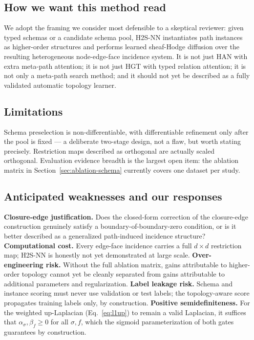 \documentclass{article}
\begin{document}
\subsection{How we want this method read}

We adopt the framing we consider most defensible to a skeptical reviewer: given typed schemas or a
candidate schema pool, H2S-NN instantiates path instances as higher-order structures and performs
learned sheaf-Hodge diffusion over the resulting heterogeneous node-edge-face incidence system. It
is not just HAN with extra meta-path attention; it is not just HGT with typed relation attention;
it is not only a meta-path search method; and it should not yet be described as a fully validated
automatic topology learner.

\subsection{Limitations}

Schema preselection is non-differentiable, with differentiable refinement only after the pool is
fixed --- a deliberate two-stage design, not a flaw, but worth stating precisely. Restriction maps
described as orthogonal are actually scaled orthogonal. Evaluation evidence breadth is the largest
open item: the ablation matrix in Section~\ref{sec:ablation-schema} currently covers one dataset
per study.

\subsection{Anticipated weaknesses and our responses}

\textbf{Closure-edge justification.} Does the closed-form correction of the closure-edge
construction genuinely satisfy a boundary-of-boundary-zero condition, or is it better described as
a generalized path-induced incidence structure? \textbf{Computational cost.} Every edge-face
incidence carries a full $d\times d$ restriction map; H2S-NN is honestly not yet demonstrated at
large scale. \textbf{Over-engineering risk.} Without the full ablation matrix, gains attributable
to higher-order topology cannot yet be cleanly separated from gains attributable to additional
parameters and regularization. \textbf{Label leakage risk.} Schema and instance scoring must never
use validation or test labels; the topology-aware score propagates training labels only, by
construction. \textbf{Positive semidefiniteness.} For the weighted up-Laplacian
(Eq.~\ref{eq:l1up}) to remain a valid Laplacian, it suffices that $\alpha_\sigma,\beta_f \geq 0$ for
all $\sigma,f$, which the sigmoid parameterization of both gates guarantees by construction.
\end{document}
